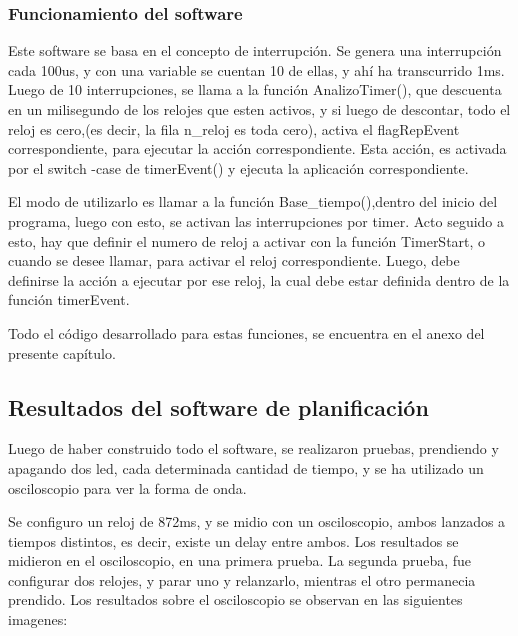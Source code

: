 \subsubsection{Funcionamiento del software} 

Este software se basa en el concepto de interrupción. Se genera una interrupción cada 100us, y con una variable se cuentan 10 de ellas, y ahí ha transcurrido 1ms. Luego de 10 interrupciones, se llama a la función AnalizoTimer(), que descuenta en un milisegundo de los relojes que esten activos, y si luego de descontar, todo el reloj es cero,(es decir, la fila n\_reloj es toda cero), activa el flagRepEvent correspondiente, para ejecutar la acción correspondiente. Esta acción, es activada por el switch -case de timerEvent() y ejecuta la aplicación correspondiente. 

El modo de utilizarlo es llamar a la función Base\_tiempo(),dentro del inicio del programa, luego con esto, se activan las interrupciones por timer. Acto seguido a esto, hay que definir el numero de reloj a activar con la función TimerStart, o cuando se desee llamar, para activar el reloj correspondiente. Luego, debe definirse la acción a ejecutar por ese reloj, la cual debe estar definida dentro de la función timerEvent. 

Todo el código desarrollado para estas funciones, se encuentra en el anexo del presente capítulo. 



\subsection{Resultados del software de planificación}

Luego de haber construido todo el software, se realizaron pruebas, prendiendo y apagando dos led, cada determinada cantidad de tiempo, y se ha utilizado un osciloscopio para ver la forma de onda.
 
Se configuro un reloj de 872ms, y se midio con un osciloscopio, ambos lanzados a tiempos distintos, es decir, existe un delay entre ambos. Los resultados se midieron en el osciloscopio, en una primera prueba. La segunda prueba, fue configurar dos relojes, y parar uno y relanzarlo, mientras el otro permanecia prendido. Los resultados sobre el osciloscopio se observan en las siguientes imagenes: 


